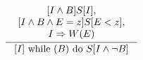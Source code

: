 $$
\inference{
    {\begin{array}{c}
        \lbrack I \land B \rbrack S [I], \\
        \lbrack I \land B \land E = z \rbrack S [E < z], \\
        I \Rightarrow W(E)
    \end{array}}
}
{[I] \textrm{ while } (B) \textrm{ do } S [I \land\lnot B]}
$$
